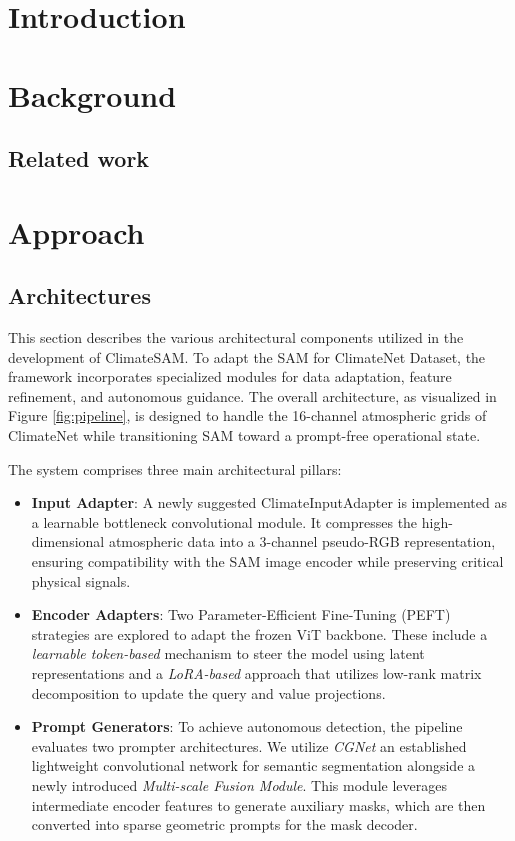 \chapter{Introduction}\label{introduction}

\chapter{Background}
\section{Related work}





\chapter{Approach}

\section{Architectures}
\label{sec:architectures}

This section describes the various architectural components utilized in the development of ClimateSAM. To adapt the SAM for ClimateNet Dataset, the framework incorporates specialized modules for data adaptation, feature refinement, and autonomous guidance. The overall architecture, as visualized in Figure \ref{fig:pipeline}, is designed to handle the 16-channel atmospheric grids of ClimateNet while transitioning SAM toward a prompt-free operational state.

The system comprises three main architectural pillars:
\begin{itemize}
    \item \textbf{Input Adapter}: A newly suggested ClimateInputAdapter is implemented as a learnable bottleneck convolutional module. It compresses the high-dimensional atmospheric data into a 3-channel pseudo-RGB representation, ensuring compatibility with the SAM image encoder while preserving critical physical signals.
    \item \textbf{Encoder Adapters}: Two Parameter-Efficient Fine-Tuning (PEFT) strategies are explored to adapt the frozen ViT backbone. These include a \textit{learnable token-based} mechanism to steer the model using latent representations and a \textit{LoRA-based} approach that utilizes low-rank matrix decomposition to update the query and value projections.
    \item \textbf{Prompt Generators}: To achieve autonomous detection, the pipeline evaluates two prompter architectures. We utilize \textit{CGNet} an established lightweight convolutional network for semantic segmentation alongside a newly introduced \textit{Multi-scale Fusion Module}. This module leverages intermediate encoder features to generate auxiliary masks, which are then converted into sparse geometric prompts for the mask decoder.
\end{itemize}

